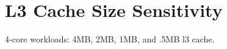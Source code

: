 \section{L3 Cache Size Sensitivity}
\label{sec:results:l2size_sensitivity}

4-core workloads: 4MB, 2MB, 1MB, and .5MB l3 cache.